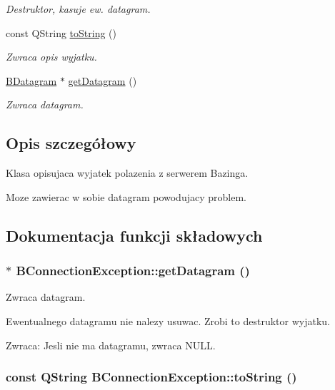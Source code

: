 \begin{CompactItemize}
\begin{CompactList}\small\item\em Destruktor, kasuje ew. datagram. \item\end{CompactList}\item 
const QString \hyperlink{class_b_connection_exception_645db90a648e008820d2506a67aca2ec}{toString} ()
\begin{CompactList}\small\item\em Zwraca opis wyjatku. \item\end{CompactList}\item 
\hyperlink{class_b_datagram}{BDatagram} $\ast$ \hyperlink{class_b_connection_exception_430b5f1f10ea49111da8ad333ec9344f}{getDatagram} ()
\begin{CompactList}\small\item\em Zwraca datagram. \item\end{CompactList}\end{CompactItemize}


\subsection{Opis szczegółowy}
Klasa opisujaca wyjatek polazenia z serwerem Bazinga. 

Moze zawierac w sobie datagram powodujacy problem. 

\subsection{Dokumentacja funkcji składowych}
\hypertarget{class_b_connection_exception_430b5f1f10ea49111da8ad333ec9344f}{
\subsubsection[{getDatagram}]{ $\ast$ BConnectionException::getDatagram ()}}
\label{class_b_connection_exception_430b5f1f10ea49111da8ad333ec9344f}


Zwraca datagram. 

Ewentualnego datagramu nie nalezy usuwac. Zrobi to destruktor wyjatku.

\begin{Desc}
\item[Zwraca:]Jesli nie ma datagramu, zwraca NULL. \end{Desc}
\hypertarget{class_b_connection_exception_645db90a648e008820d2506a67aca2ec}{
\subsubsection[{toString}]{\setlength{\rightskip}{0pt plus 5cm}const QString BConnectionException::toString ()}}
\label{class_b_connection_exception_645db90a648e008820d2506a67aca2ec}


